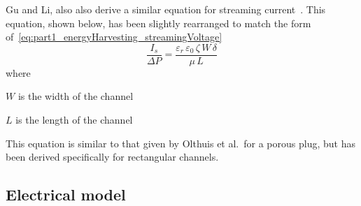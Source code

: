      Gu and Li, also also derive a similar equation for streaming current~\cite{Gu2000}.
      This equation, shown below, has been slightly rearranged to match the form of~\ref{eq:part1_energyHarvesting_streamingVoltage}
      \begin{equation}
          \frac{I_{s}}{\Delta P} = \frac{\varepsilon_{r}\,\varepsilon_{0}\,\zeta\,W\,\delta}{\mu\,L}
          \label{eq:part1_energyHarvesting_streamingCurrent}
      \end{equation}
      where
      \begin{description}
          \item $W$ is the width of the channel
          \item $L$ is the length of the channel
      \end{description}
      This equation is similar to that given by Olthuis et al.\ for a porous plug, but has been derived specifically for rectangular channels\cite{Olthuis2005}.


  \subsection{Electrical model}
    \label{sub:part1_energyHarvesting_generalAnalysis_electricalModel}


